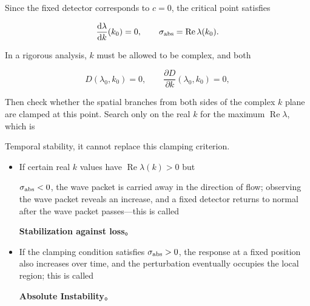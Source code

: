 \documentclass[11pt,a4paper,openany]{book}
\numberwithin{equation}{chapter}
\numberwithin{figure}{chapter}
\numberwithin{table}{chapter}
\newcommand{\cnemph}[1]{{\quotefont #1}}
\begin{document}
Since the fixed detector corresponds to $c=0$, the critical point satisfies

\begin{equation}
\frac{\mathrm d\lambda}{\mathrm dk}(k_0)=0,
\qquad
\sigma_{\rm abs}=\operatorname{Re}\lambda(k_0).
\label{eq:absolute-saddle}
\end{equation}

In a rigorous analysis, $k$ must be allowed to be complex, and both

\begin{equation}
D(\lambda_0,k_0)=0,\qquad
\frac{\partial D}{\partial k}(\lambda_0,k_0)=0,
\label{eq:briggs-bers}
\end{equation}

Then check whether the spatial branches from both sides of the complex $k$ plane are clamped at this point. Search only on the real $k$ for the maximum $\operatorname{Re}\lambda$, which is




\cnemph{Temporal stability}, it cannot replace this clamping criterion.










\begin{itemize}[leftmargin=1.5em,itemsep=3pt]
\item




 If certain real $k$ values have $\operatorname{Re}\lambda(k)>0$ but

$\sigma_{\rm abs}<0$, the wave packet is carried away in the direction of flow; observing the wave packet reveals an increase, and a fixed detector returns to normal after the wave packet passes—this is called




\textbf{Stabilization against loss}。
\item




If the clamping condition satisfies $\sigma_{\rm abs}>0$, the response at a fixed position also increases over time, and the perturbation eventually occupies the local region; this is called




\textbf{Absolute Instability}。
\end{itemize}
\end{document}
